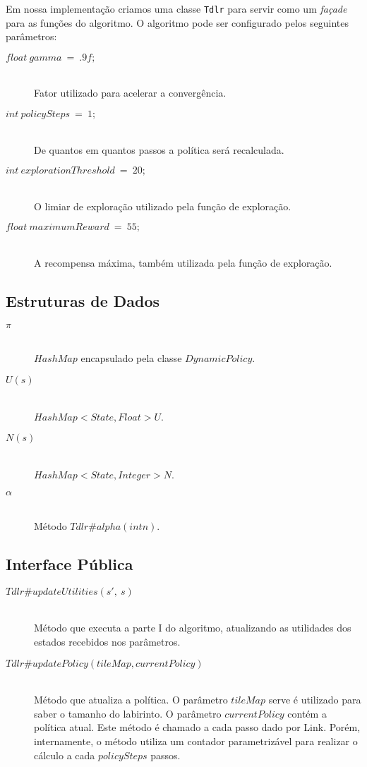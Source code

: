 \documentclass[letterpaper]{article}
\begin{document}
Em nossa implementação criamos uma classe \texttt{Tdlr} para servir como um \textit{façade} para
as funções do algoritmo. O algoritmo pode ser configurado pelos seguintes parâmetros:

\begin{description}
  \item[$float\ gamma\ =\ .9f;$] \hfill \\
  Fator utilizado para acelerar a convergência.
  \item[$int\ policySteps\ =\ 1;$] \hfill \\
  De quantos em quantos passos a política será recalculada.
  \item[$int\ explorationThreshold\ =\ 20;$] \hfill \\
  O limiar de exploração utilizado pela função de exploração.
  \item[$float\ maximumReward\ =\ 55;$] \hfill \\
  A recompensa máxima, também utilizada pela função de exploração.

\end{description}

\subsection{Estruturas de Dados}

\begin{description}
\item[$\pi$] \hfill \\ $HashMap$ encapsulado pela classe $DynamicPolicy$.
\item[$U(s)$] \hfill \\ $HashMap<State, Float> U$.
\item[$N(s)$] \hfill \\ $HashMap<State, Integer> N$.
\item[$\alpha$] \hfill \\ Método $Tdlr\#alpha(int n)$.
\end{description}

\subsection{Interface Pública}

\begin{description}
\item[$Tdlr\#updateUtilities(s\prime,\ s)$] \hfill\\
  Método que executa a parte I do algoritmo, atualizando as utilidades dos estados recebidos
  nos parâmetros.
\item[$Tdlr\#updatePolicy(tileMap, currentPolicy)$] \hfill\\
  Método que atualiza a política. O parâmetro $tileMap$ serve é utilizado para saber o tamanho do
  labirinto. O parâmetro $currentPolicy$ contém a política atual. Este método é chamado a cada
  passo dado por Link. Porém, internamente, o método utiliza um contador parametrizável para
  realizar o cálculo a cada $policySteps$ passos.
\end{description}
\end{document}
